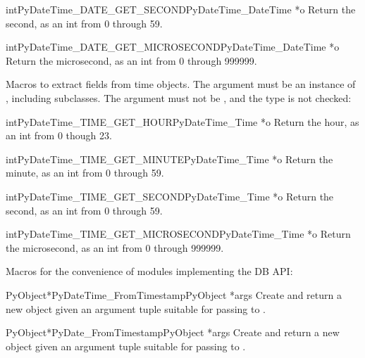 \begin{cfuncdesc}{int}{PyDateTime_DATE_GET_SECOND}{PyDateTime_DateTime *o}
  Return the second, as an int from 0 through 59.
\end{cfuncdesc}

\begin{cfuncdesc}{int}{PyDateTime_DATE_GET_MICROSECOND}{PyDateTime_DateTime *o}
  Return the microsecond, as an int from 0 through 999999.
\end{cfuncdesc}

Macros to extract fields from time objects.  The argument must be an
instance of , including subclasses.
The argument must not be \NULL{}, and the type is not checked:

\begin{cfuncdesc}{int}{PyDateTime_TIME_GET_HOUR}{PyDateTime_Time *o}
  Return the hour, as an int from 0 though 23.
\end{cfuncdesc}

\begin{cfuncdesc}{int}{PyDateTime_TIME_GET_MINUTE}{PyDateTime_Time *o}
  Return the minute, as an int from 0 through 59.
\end{cfuncdesc}

\begin{cfuncdesc}{int}{PyDateTime_TIME_GET_SECOND}{PyDateTime_Time *o}
  Return the second, as an int from 0 through 59.
\end{cfuncdesc}

\begin{cfuncdesc}{int}{PyDateTime_TIME_GET_MICROSECOND}{PyDateTime_Time *o}
  Return the microsecond, as an int from 0 through 999999.
\end{cfuncdesc}

Macros for the convenience of modules implementing the DB API:

\begin{cfuncdesc}{PyObject*}{PyDateTime_FromTimestamp}{PyObject *args}
  Create and return a new  object given an argument
  tuple suitable for passing to .
\end{cfuncdesc}

\begin{cfuncdesc}{PyObject*}{PyDate_FromTimestamp}{PyObject *args}
  Create and return a new  object given an argument
  tuple suitable for passing to .
\end{cfuncdesc}
